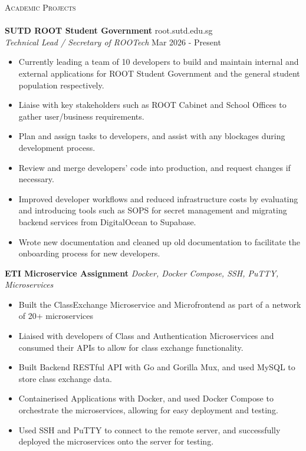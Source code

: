\documentclass[a4paper]{article}
\newcommand{\lineunder} {
    \vspace*{-8pt} \\
    \hspace*{-18pt} \hrulefill \\
}
\newcommand{\header} [1] {
    {\hspace*{-18pt}\vspace*{6pt} \textsc{#1}}
    \vspace*{-6pt} \lineunder
}
\begin{document}
\header{Academic Projects}
{\textbf{SUTD ROOT Student Government}} \hfill root.sutd.edu.sg\\
\textit{Technical Lead / Secretary of ROOTech} \hfill Mar 2026 - Present\\
\vspace{-1mm}
\begin{itemize} \itemsep 0.5pt
    \item Currently leading a team of 10 developers to build and maintain internal and external applications for ROOT Student Government and the general student population respectively.
    \item Liaise with key stakeholders such as ROOT Cabinet and School Offices to gather user/business requirements.
    \item Plan and assign tasks to developers, and assist with any blockages during development process.
    \item Review and merge developers' code into production, and request changes if necessary.
    \item Improved developer workflows and reduced infrastructure costs by evaluating and introducing tools such as SOPS for secret management and migrating backend services from DigitalOcean to Supabase.
    \item Wrote new documentation and cleaned up old documentation to facilitate the onboarding process for new developers.
\end{itemize}
\clearpage
{\textbf{ETI Microservice Assignment}} {\sl Docker, Docker Compose, SSH, PuTTY, Microservices} \\
\begin{itemize} \itemsep 0.5pt
    \item Built the ClassExchange Microservice and Microfrontend as part of a network of 20+ microservices
    \item Liaised with developers of Class and Authentication Microservices and consumed their APIs to allow for class exchange functionality.
    \item Built Backend RESTful API with Go and Gorilla Mux, and used MySQL to store class exchange data.
    \item Containerised Applications with Docker, and used Docker Compose to orchestrate the microservices, allowing for easy deployment and testing.
    \item Used SSH and PuTTY to connect to the remote server, and successfully deployed the microservices onto the server for testing.
\end{itemize}
\end{document}
